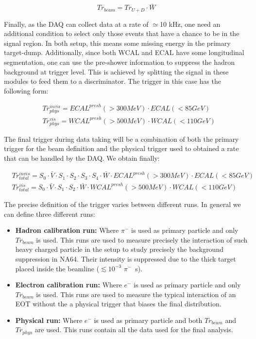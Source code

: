 \begin{equation}
  \label{eq:trigger-beam}
  Tr_{beam} = Tr_{U+D} \cdot \bar{W}
\end{equation}

Finally, as the DAQ can collect data at a rate of $\simeq$10 \si{kHz}, one need an additional condition to select only those events that have a chance to be in the signal region. In both setup, this means some missing energy in the primary target-dump. Additionally, since both WCAL and ECAL have some longitudinal segmentation, one can use the pre-shower information to suppress the hadron background at trigger level. This is achieved by splitting the signal in these modules to feed them to a discriminator. The trigger in this case has the following form:

\begin{equation}
  \label{eq:trigger-phys}
  \begin{split}
    & Tr^{invis}_{phys} = ECAL^{presh}(>300 MeV) \cdot ECAL(<85 GeV)\\
    & Tr^{vis}_{phys} = WCAL^{presh}(>500 MeV) \cdot WCAL(<110 GeV)
  \end{split}
\end{equation}

The final trigger during data taking will be a combination of both the primary trigger for the beam definition and the physical trigger used to obtained a rate that can be handled by the DAQ. We obtain finally:

\begin{equation}
  \label{eq:trigger-total}
  \begin{split}
  & Tr^{invis}_{total} = S_0 \cdot \bar{V} \cdot S_1 \cdot S_2 \cdot S_3 \cdot S_4 \cdot \bar{W} \cdot ECAL^{presh}(>300 MeV) \cdot ECAL(<85 GeV)\\
  & Tr^{vis}_{total} = S_0 \cdot \bar{V} \cdot S_1 \cdot S_2\cdot \bar{W} \cdot WCAL^{presh}(>500 MeV) \cdot WCAL(<110 GeV)
  \end{split}
\end{equation}

The precise definition of the trigger varies between different runs. In general we can define three different runs:

\begin{itemize}
\item \textbf{Hadron calibration run:} Where $\pi^-$ is used as primary particle and only $Tr_{beam}$ is used. This runs are used to measure precisely the interaction of such heavy charged particle in the setup to study precisely the background suppression in NA64. Their intensity is suppressed due to the thick target placed inside the beamline ($\lesssim 10^{-3}$ $\pi^-$\si{\per\second}).
\item \textbf{Electron calibration run:} Where $e^-$ is used as primary particle and only $Tr_{beam}$ is used. This runs are used to measure the typical interaction of an EOT without the a physical trigger that biases the final distribution. 
\item \textbf{Physical run:} Where $e^-$ is used as primary particle and both $Tr_{beam}$ and $Tr_{phys}$ are used. This runs contain all the data used for the final analysis. 
\end{itemize}


